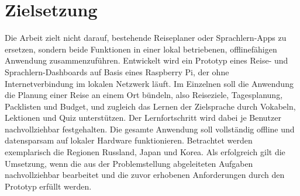 \documentclass[12pt,a4paper]{scrreprt}
\begin{document}
\section{Zielsetzung}
Die Arbeit zielt nicht darauf, bestehende Reiseplaner oder Sprachlern-Apps zu ersetzen, sondern beide Funktionen in einer lokal betriebenen, offlinefähigen Anwendung zusammenzuführen. Entwickelt wird ein Prototyp eines Reise- und Sprachlern-Dashboards auf Basis eines Raspberry Pi, der ohne Internetverbindung im lokalen Netzwerk läuft. Im Einzelnen soll die Anwendung die Planung einer Reise an einem Ort bündeln, also Reiseziele, Tagesplanung, Packlisten und Budget, und zugleich das Lernen der Zielsprache durch Vokabeln, Lektionen und Quiz unterstützen. Der Lernfortschritt wird dabei je Benutzer nachvollziehbar festgehalten. Die gesamte Anwendung soll vollständig offline und datensparsam auf lokaler Hardware funktionieren. Betrachtet werden exemplarisch die Regionen Russland, Japan und Korea. Als erfolgreich gilt die Umsetzung, wenn die aus der Problemstellung abgeleiteten Aufgaben nachvollziehbar bearbeitet und die zuvor erhobenen Anforderungen durch den Prototyp erfüllt werden.
\end{document}

